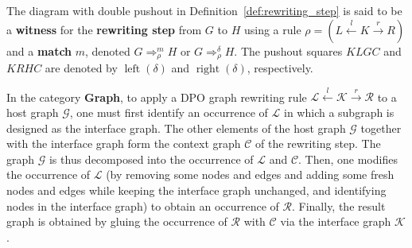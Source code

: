 The diagram with double pushout in Definition~\ref{def:rewriting_step} is said to be a \textbf{witness} for the \textbf{rewriting step} from \( G \) to \( H \) using
a rule \( \rho \mathop{=} (L \overset{l}{\leftarrow} K \overset{r}{\rightarrow} R) \) and a \textbf{match} $m$, denoted \( G \mathop{\Rightarrow}_\rho^m H \) or \( G \mathop{\Rightarrow}_\rho^\delta H \). The pushout squares $KLGC$ and $KRHC$ are denoted by $\operatorname{left}(\delta)$ and $\operatorname{right}(\delta)$, respectively.

In the category \textbf{Graph}, to apply a DPO graph rewriting rule $\mathcal{L} \overset{l}{\leftarrow} \mathcal{K} \overset{r}{\rightarrow} \mathcal{R}$ to a host graph $\mathcal{G}$, one must first identify an occurrence of $\mathcal{L}$ in which a subgraph is designed as the interface graph. The other elements of the host graph $\mathcal{G}$ together with the interface graph form the context graph $\mathcal{C}$ of the rewriting step.
The graph $\mathcal{G}$ is thus decomposed into the occurrence of $\mathcal{L}$ and $\mathcal{C}$. 
Then, one modifies the occurrence of $\mathcal{L}$ (by removing some nodes and edges and adding some fresh nodes and edges while keeping the interface graph unchanged, and identifying nodes in the interface graph)
to obtain an occurrence of $\mathcal{R}$. Finally, the result graph is obtained by gluing the occurrence of $\mathcal{R}$ with $\mathcal{C}$ via the interface graph $\mathcal{K}$.

